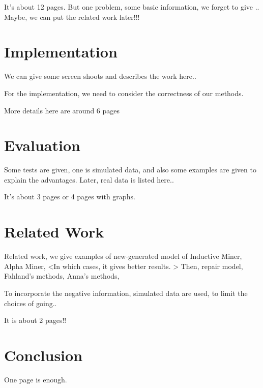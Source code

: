 \documentclass[]{article}
\begin{document}
It's about 12 pages. But one problem, some basic information, we forget to give .. Maybe, we can put the related work later!!!


\section{Implementation}

We can give some screen shoots and describes the work here..

For the implementation, we need to consider the correctness of our methods.

More details here are around 6 pages
\section{Evaluation}
Some tests are given, one is simulated data, and also some examples are given to explain the advantages. Later, real data is listed here.. 

It's about 3 pages or 4 pages with graphs. 

\section{Related Work}
Related work, we give examples of new-generated model of Inductive Miner, Alpha Miner, <In which cases, it gives better results. > 
Then, repair model, 
Fahland's methods,  
Anna's methods,

To incorporate the negative information, simulated data are used, to limit the choices of going..

It is about 2 pages!!
\section{Conclusion}
One page is enough. 
\end{document}
